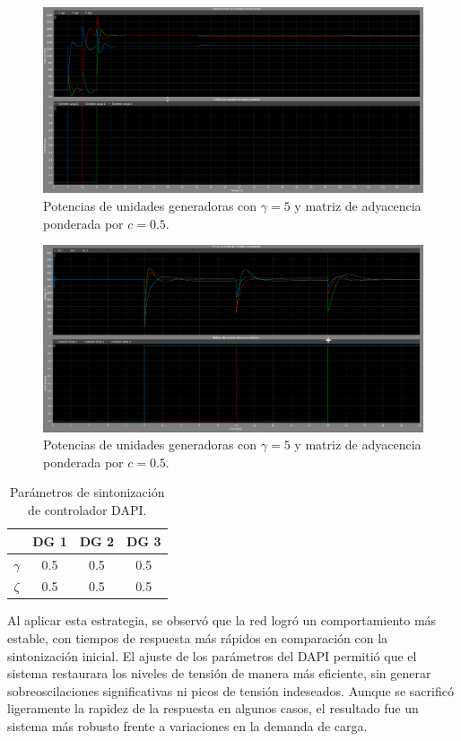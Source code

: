 \begin{figure}
    \centering
    \includegraphics[width=0.5\linewidth]{Tarea 2/report/imagenes/p2b/potencia-mala.png}
    \caption{Potencias de unidades generadoras con $\gamma = 5$ y matriz de adyacencia ponderada por $c = 0.5$.}
    \label{potencia-mala}
\end{figure}

\begin{figure}
    \centering
    \includegraphics[width=0.5\linewidth]{Tarea 2/report/imagenes/p2b/voltaje-compartido.png}
    \caption{Potencias de unidades generadoras con $\gamma = 5$ y matriz de adyacencia ponderada por $c = 0.5$.}
    \label{voltaje-compartido}
\end{figure}


\begin{table}[h!]
\centering
\begin{tabular}{|c|c|c|c|}
\hline
 & DG 1 & DG 2 & DG 3 \\ 
\hline
$\gamma$ & 0.5 & 0.5 & 0.5 \\ 
\hline
$\zeta$  & 0.5 & 0.5 & 0.5 \\ 
\hline
\end{tabular}
\caption{Parámetros de sintonización de controlador DAPI.}
\label{parametros_dapi}
\end{table}


Al aplicar esta estrategia, se observó que la red logró un comportamiento más estable, con tiempos de respuesta más rápidos en comparación con la sintonización inicial. El ajuste de los parámetros del DAPI permitió que el sistema restaurara los niveles de tensión de manera más eficiente, sin generar sobreoscilaciones significativas ni picos de tensión indeseados. Aunque se sacrificó ligeramente la rapidez de la respuesta en algunos casos, el resultado fue un sistema más robusto frente a variaciones en la demanda de carga.\\

